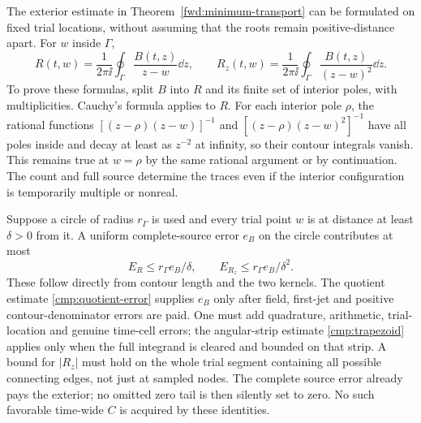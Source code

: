 The exterior estimate in Theorem~\ref{fwd:minimum-transport} can be
formulated on fixed trial locations, without assuming that the roots
remain positive-distance apart. For $w$ inside $\Gamma$,
\begin{equation}
 R(t,w)=\frac1{2\pi\ii}\oint_\Gamma\frac{B(t,z)}{z-w}\dd z,
 \qquad
 R_z(t,w)=\frac1{2\pi\ii}\oint_\Gamma
                         \frac{B(t,z)}{(z-w)^2}\dd z.
 \label{fwd:source-traces}
\end{equation}
To prove these formulas, split $B$ into $R$ and its finite set of
interior poles, with multiplicities. Cauchy's formula applies to $R$.
For each interior pole $\rho$, the rational functions
$[(z-\rho)(z-w)]^{-1}$ and
$[(z-\rho)(z-w)^2]^{-1}$ have all poles inside and decay at least as
$z^{-2}$ at infinity, so their contour integrals vanish. This remains
true at $w=\rho$ by the same rational argument or by continuation.
The count and full source determine the traces even if the interior
configuration is temporarily multiple or nonreal.

Suppose a circle of radius $r_\Gamma$ is used and every trial point $w$
is at distance at least $\delta>0$ from it. A uniform complete-source
error $e_B$ on the circle contributes at most
\begin{equation}
 E_R\le r_\Gamma e_B/\delta,\qquad
 E_{R_z}\le r_\Gamma e_B/\delta^2.
 \label{fwd:trace-error}
\end{equation}
These follow directly from contour length and the two kernels.
The quotient estimate \eqref{cmp:quotient-error} supplies $e_B$ only
after field, first-jet and positive contour-denominator errors are paid.
One must add quadrature, arithmetic, trial-location and genuine time-cell
errors; the angular-strip estimate \eqref{cmp:trapezoid} applies only
when the full integrand is cleared and bounded on that strip. A bound
for $|R_z|$ must hold on the whole trial segment containing all possible
connecting edges, not just at sampled nodes. The complete source error
already pays the exterior; no omitted zero tail is then silently set
to zero. No such favorable time-wide $C$ is acquired by these identities.

